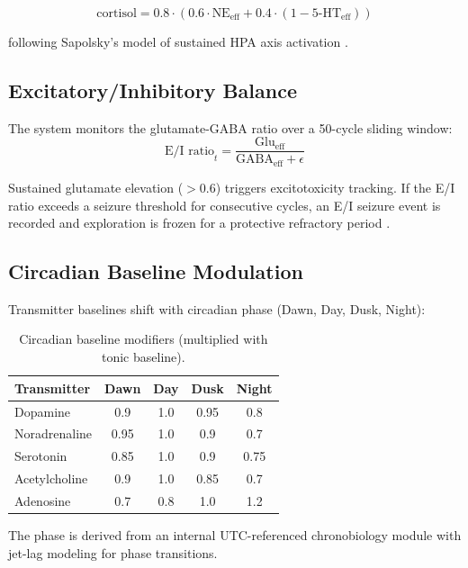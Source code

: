 \documentclass[11pt,a4paper]{article}
\begin{document}
\begin{equation}
\text{cortisol} = 0.8 \cdot (0.6 \cdot \text{NE}_{\text{eff}} + 0.4 \cdot (1 - \text{5-HT}_{\text{eff}}))
\end{equation}

\noindent following Sapolsky's model of sustained HPA axis activation \citep{sapolsky2004}.

\subsection{Excitatory/Inhibitory Balance}

The system monitors the glutamate-GABA ratio over a 50-cycle sliding window:
\begin{equation}
\text{E/I ratio}_t = \frac{\text{Glu}_{\text{eff}}}{\text{GABA}_{\text{eff}} + \epsilon}
\end{equation}

Sustained glutamate elevation ($> 0.6$) triggers excitotoxicity tracking. If the E/I ratio exceeds a seizure threshold for consecutive cycles, an E/I seizure event is recorded and exploration is frozen for a protective refractory period \citep{bhatt2009, turrigiano2012}.

\subsection{Circadian Baseline Modulation}

Transmitter baselines shift with circadian phase (Dawn, Day, Dusk, Night):

\begin{table}[h]
\centering
\caption{Circadian baseline modifiers (multiplied with tonic baseline).}
\label{tab:circadian}
\begin{tabular}{lcccc}
\toprule
\textbf{Transmitter} & \textbf{Dawn} & \textbf{Day} & \textbf{Dusk} & \textbf{Night} \\
\midrule
Dopamine & 0.9 & 1.0 & 0.95 & 0.8 \\
Noradrenaline & 0.95 & 1.0 & 0.9 & 0.7 \\
Serotonin & 0.85 & 1.0 & 0.9 & 0.75 \\
Acetylcholine & 0.9 & 1.0 & 0.85 & 0.7 \\
Adenosine & 0.7 & 0.8 & 1.0 & 1.2 \\
\bottomrule
\end{tabular}
\end{table}

The phase is derived from an internal UTC-referenced chronobiology module with jet-lag modeling for phase transitions.
\end{document}

